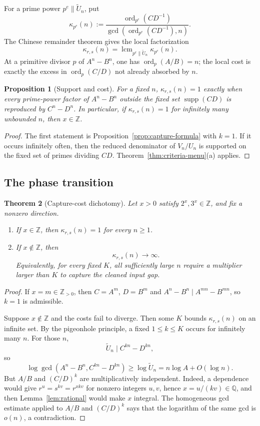\documentclass[11pt,oneside]{article}
\newtheorem{theorem}{Theorem}[section]
\newtheorem{proposition}[theorem]{Proposition}
\theoremstyle{definition}
\theoremstyle{remark}
\newcommand{\Z}{\mathbb Z}
\newcommand{\Q}{\mathbb Q}
\newcommand{\ord}{\operatorname{ord}}
\newcommand{\supp}{\operatorname{supp}}
\begin{document}
For a prime power $p^e\parallel\widetilde U_n$, put
\[
 \kappa_{p^e}(n)
 :=\frac{\ord_{p^e}(CD^{-1})}
         {\gcd(\ord_{p^e}(CD^{-1}),n)}.
\]
The Chinese remainder theorem gives the local factorization
\[
 \kappa_{r,s}(n)
 =\operatorname{lcm}_{p^e\parallel\widetilde U_n}\kappa_{p^e}(n).
\]
At a primitive divisor $p$ of $A^n-B^n$, one has $\ord_p(A/B)=n$; the local cost is exactly
the excess in $\ord_p(C/D)$ not already absorbed by $n$.

\begin{proposition}[Support and cost]
\label{prop:support-cost}
For a fixed $n$, $\kappa_{r,s}(n)=1$ exactly when every prime-power factor of
$A^n-B^n$ outside the fixed set $\supp(CD)$ is reproduced by $C^n-D^n$.  In particular,
if $\kappa_{r,s}(n)=1$ for infinitely many unbounded $n$, then $x\in\Z$.
\end{proposition}

\begin{proof}
The first statement is Proposition~\ref{prop:capture-formula} with $k=1$.  If it occurs
infinitely often, then the reduced denominator of $V_n/U_n$ is supported on the fixed set of
primes dividing $CD$.  Theorem~\ref{thm:criteria-menu}(a) applies.
\end{proof}

\subsection{The phase transition}

\begin{theorem}[Capture-cost dichotomy]
\label{thm:capture-dichotomy}
Let $x>0$ satisfy $2^x,3^x\in\Z$, and fix a nonzero direction.
\begin{enumerate}[label=\textup{(\roman*)}]
\item If $x\in\Z$, then $\kappa_{r,s}(n)=1$ for every $n\ge1$.
\item If $x\notin\Z$, then
\[
 \kappa_{r,s}(n)\longrightarrow\infty.
\]
Equivalently, for every fixed $K$, all sufficiently large $n$ require a multiplier larger
than $K$ to capture the cleaned input gap.
\end{enumerate}
\end{theorem}

\begin{proof}
If $x=m\in\Z_{>0}$, then $C=A^m$, $D=B^m$ and
$A^n-B^n\mid A^{mn}-B^{mn}$, so $k=1$ is admissible.

Suppose $x\notin\Z$ and the costs fail to diverge.  Then some $K$ bounds
$\kappa_{r,s}(n)$ on an infinite set.  By the pigeonhole principle, a fixed
$1\le k\le K$ occurs for infinitely many $n$.  For those $n$,
\[
 \widetilde U_n\mid C^{kn}-D^{kn},
\]
so
\[
 \log\gcd(A^n-B^n,C^{kn}-D^{kn})
 \ge\log\widetilde U_n
 =n\log A+O(\log n).
\]
But $A/B$ and $(C/D)^k$ are multiplicatively independent.  Indeed, a dependence would give
$r^u=s^{kv}=r^{xkv}$ for nonzero integers $u,v$, hence $x=u/(kv)\in\Q$, and then
Lemma~\ref{lem:rational} would make $x$ integral.  The homogeneous gcd estimate applied to
$A/B$ and $(C/D)^k$ says that the logarithm of the same gcd is $o(n)$, a contradiction.
\end{proof}
\end{document}

